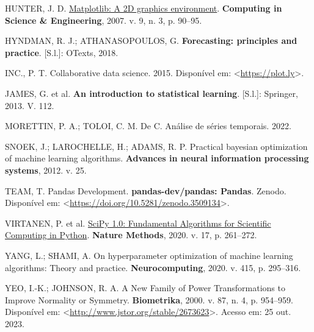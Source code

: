 \documentclass[
  12pt,
  a4paper,
]{scrreprt}
\newlength{\cslhangindent}
\newenvironment{CSLReferences}[2] %
 {\begin{list}{}{%
  \setlength{\itemindent}{0pt}
  \setlength{\leftmargin}{0pt}
  \setlength{\parsep}{0pt}
  \ifodd #1
   \setlength{\leftmargin}{\cslhangindent}
   \setlength{\itemindent}{-1\cslhangindent}
  \fi
  \setlength{\itemsep}{#2\baselineskip}}}
 {\end{list}}
\begin{document}
\begin{CSLReferences}{0}{1}
HUNTER, J. D. \href{https://doi.org/10.1109/MCSE.2007.55}{Matplotlib: A
2D graphics environment}. \textbf{Computing in Science \& Engineering},
2007. v. 9, n. 3, p. 90--95.

HYNDMAN, R. J.; ATHANASOPOULOS, G. \textbf{Forecasting: principles and
practice}. {[}S.l.{]}: OTexts, 2018.

INC., P. T. Collaborative data science. 2015. Disponível em:
\textless{}\url{https://plot.ly}\textgreater.

JAMES, G. et al. \textbf{An introduction to statistical learning}.
{[}S.l.{]}: Springer, 2013. V. 112.

MORETTIN, P. A.; TOLOI, C. M. De C. An{á}lise de s{é}ries temporais.
2022.

SNOEK, J.; LAROCHELLE, H.; ADAMS, R. P. Practical bayesian optimization
of machine learning algorithms. \textbf{Advances in neural information
processing systems}, 2012. v. 25.

TEAM, T. Pandas Development. \textbf{pandas-dev/pandas: Pandas}. Zenodo.
Disponível em:
\textless{}\url{https://doi.org/10.5281/zenodo.3509134}\textgreater.

VIRTANEN, P. et al.
\href{https://doi.org/10.1038/s41592-019-0686-2}{{{SciPy} 1.0:
Fundamental Algorithms for Scientific Computing in Python}}.
\textbf{Nature Methods}, 2020. v. 17, p. 261--272.

YANG, L.; SHAMI, A. On hyperparameter optimization of machine learning
algorithms: Theory and practice. \textbf{Neurocomputing}, 2020. v. 415,
p. 295--316.

YEO, I.-K.; JOHNSON, R. A. A New Family of Power Transformations to
Improve Normality or Symmetry. \textbf{Biometrika}, 2000. v. 87, n. 4,
p. 954--959. Disponível em:
\textless{}\url{http://www.jstor.org/stable/2673623}\textgreater. Acesso
em: 25 out. 2023.

\end{CSLReferences}
\end{document}
